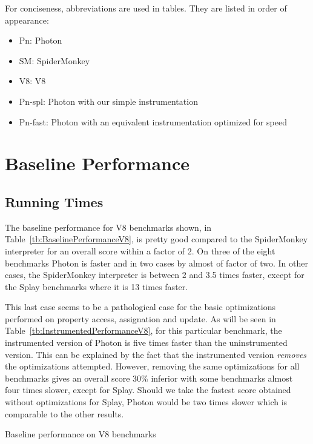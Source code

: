 For conciseness, abbreviations are used in tables. They are listed in order of 
appearance:
\begin{itemize}
    \item Pn: Photon
    \item SM: SpiderMonkey
    \item V8: V8
    \item Pn-spl: Photon with our simple instrumentation
    \item Pn-fast: Photon with an equivalent instrumentation optimized for speed
\end{itemize}

\section{Baseline Performance}

\subsection{Running Times}

The baseline performance for V8 benchmarks shown, in
Table~\ref{tb:BaselinePerformanceV8}, is pretty good compared to the
SpiderMonkey interpreter for an overall score within a factor of 2. On three of
the eight benchmarks Photon is faster and in two cases by almost of factor of
two. In other cases, the SpiderMonkey interpreter is between 2 and 3.5 times
faster, except for the Splay benchmarks where it is 13 times faster. 

This last case seems to be a pathological case for the basic optimizations
performed on property access, assignation and update. As will be seen in
Table~\ref{tb:InstrumentedPerformanceV8}, for this particular benchmark, the
instrumented version of Photon is five times faster than the uninstrumented
version. This can be explained by the fact that the instrumented version
\textit{removes} the optimizations attempted. However, removing the same
optimizations for all benchmarks gives an overall score 30\% inferior with some
benchmarks almost four times slower, except for Splay. Should we take the
fastest score obtained without optimizations for Splay, Photon would be two
times slower which is comparable to the other results.

\begin{table}[htb]
\caption{Baseline performance on V8 benchmarks}
\centering
    
\label{tb:BaselinePerformanceV8}
\end{table}

